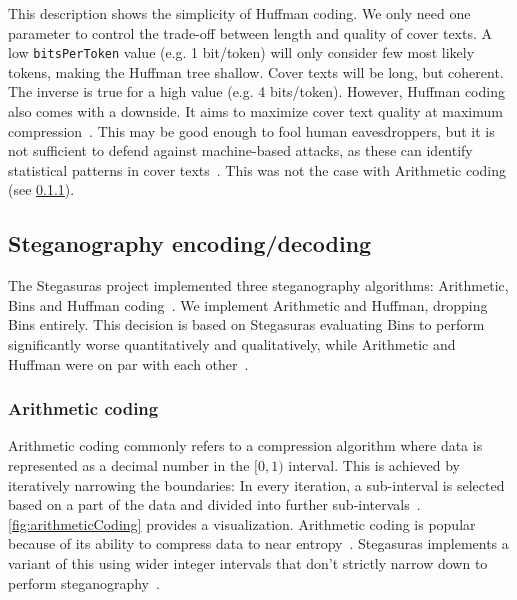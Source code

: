 This description shows the simplicity of Huffman coding. We only need one parameter to control the trade-off between length and quality of cover texts. A low \lstinline|bitsPerToken| value (e.g. 1 bit/token) will only consider few most likely tokens, making the Huffman tree shallow. Cover texts will be long, but coherent. The inverse is true for a high value (e.g. 4 bits/token). However, Huffman coding also comes with a downside. It aims to maximize cover text quality at maximum compression~\cite{zieglerNeuralLinguisticSteganography2019}. This may be good enough to fool human eavesdroppers, but it is not sufficient to defend against machine-based attacks, as these can identify statistical patterns in cover texts~\cite{zieglerNeuralLinguisticSteganography2019}. This was not the case with Arithmetic coding (see \cref{sec:arithmeticCoding}).

\subsection{Steganography encoding/decoding}
\label{sec:steganographyEncodingDecoding}
The Stegasuras project implemented three steganography algorithms: Arithmetic, Bins and Huffman coding~\cite{zieglerNeuralLinguisticSteganography2019}. We implement Arithmetic and Huffman, dropping Bins entirely. This decision is based on Stegasuras evaluating Bins to perform significantly worse quantitatively and qualitatively, while Arithmetic and Huffman were on par with each other~\cite{zieglerNeuralLinguisticSteganography2019}.

\subsubsection{Arithmetic coding}
\label{sec:arithmeticCoding}
Arithmetic coding commonly refers to a compression algorithm where data is represented as a decimal number in the $ [0, 1) $ interval. This is achieved by iteratively narrowing the boundaries: In every iteration, a sub-interval is selected based on a part of the data and divided into further sub-intervals~\cite{rissanenArithmeticCoding1979}. \cref{fig:arithmeticCoding} provides a visualization. Arithmetic coding is popular because of its ability to compress data to near entropy~\cite{rissanenArithmeticCoding1979}. Stegasuras implements a variant of this using wider integer intervals that don't strictly narrow down to perform steganography~\cite{zieglerNeuralLinguisticSteganography2019,rubinArithmeticStreamCoding1979}.

